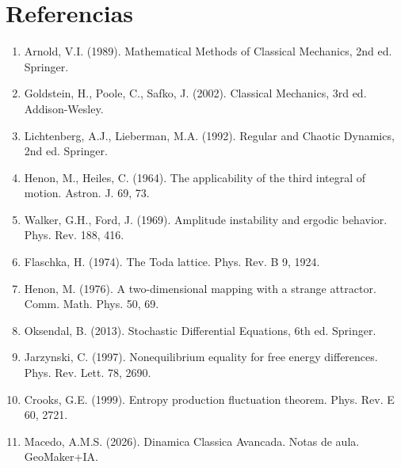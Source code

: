 \documentclass[12pt,a4paper,oneside]{article}
\begin{document}
\section{Referencias}
\begin{enumerate}[leftmargin=*]
\item Arnold, V.I. (1989). Mathematical Methods of Classical Mechanics, 2nd ed. Springer.
\item Goldstein, H., Poole, C., Safko, J. (2002). Classical Mechanics, 3rd ed. Addison-Wesley.
\item Lichtenberg, A.J., Lieberman, M.A. (1992). Regular and Chaotic Dynamics, 2nd ed. Springer.
\item Henon, M., Heiles, C. (1964). The applicability of the third integral of motion. Astron. J. 69, 73.
\item Walker, G.H., Ford, J. (1969). Amplitude instability and ergodic behavior. Phys. Rev. 188, 416.
\item Flaschka, H. (1974). The Toda lattice. Phys. Rev. B 9, 1924.
\item Henon, M. (1976). A two-dimensional mapping with a strange attractor. Comm. Math. Phys. 50, 69.
\item Oksendal, B. (2013). Stochastic Differential Equations, 6th ed. Springer.
\item Jarzynski, C. (1997). Nonequilibrium equality for free energy differences. Phys. Rev. Lett. 78, 2690.
\item Crooks, G.E. (1999). Entropy production fluctuation theorem. Phys. Rev. E 60, 2721.
\item Macedo, A.M.S. (2026). Dinamica Classica Avancada. Notas de aula. GeoMaker+IA.
\end{enumerate}
\end{document}
